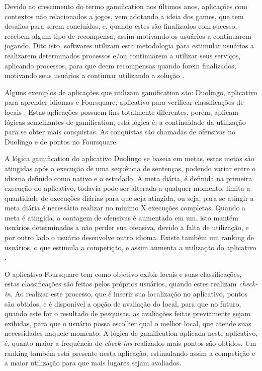 \par Devido ao crescimento do termo gamification nos últimos anos, \cite{groh2012gamification} aplicações com contextos não relacionados a jogos, vem adotando a ideia dos games, que tem desafios para serem concluídos, e, quando estes são finalizados com sucesso, recebem algum tipo de recompensa, assim motivando os usuários a continuarem jogando. Dito isto, softwares utilizam esta metodologia para estimular usuários a realizarem determinados processos e/ou continuarem a utilizar seus serviços, aplicando processos, para que deem recompensas quando forem finalizados, motivando seus usuários a continuar utilizando a solução \cite{hamari2014does}.
\par Alguns exemplos de aplicações que utilizam gamification são: Duolingo, aplicativo para aprender idiomas \cite{melo2016eficiencia} e Foursquare, aplicativo para verificar classificações de locais \cite{huotari2012defining}. Estas aplicações possuem fins totalmente diferentes, porém, aplicam lógicas semelhantes de gamification, está lógica é, a continuidade da utilização para se obter mais conquistas. As conquistas são chamadas de ofensivas no Duolingo e de pontos no Foursquare.
\par A lógica gamification do aplicativo Duolingo se baseia em metas, estas metas são atingidas após a execução de uma sequência de sentenças, podendo variar entre o idioma definido como nativo e o estudado. A meta diária, é definida na primeira execução do aplicativo, todavia pode ser alterada a qualquer momento, limita a quantidade de execuções diárias para que seja atingida, ou seja, para se atingir a meta diária é necessário realizar no mínimo X execuções completas. Quando a meta é atingida, a contagem de ofensivas é aumentada em um, isto mantém usuários determinados a não perder sua ofensiva, devido a falta de utilização, e por outro lado o usuário desenvolve outro idioma. Existe também um ranking de usuários, o que estimula a competição, e assim aumenta a utilização do aplicativo \cite{melo2016eficiencia}. 
\par O aplicativo Foursquare tem como objetivo exibir locais e suas classificações, estas classificações são feitas pelos próprios usuários, quando estes realizam \textit{check-in}. Ao realizar este processo, que é inserir sua localização no aplicativo, pontos são obtidos, e é disponível a opção de avaliação do local, para que no futuro, quando este for o resultado de pesquisas, as avaliações feitas previamente sejam exibidas, para que o usuário possa escolher qual o melhor local, que atende suas necessidades naquele momento. A lógica de gamification aplicada neste aplicativo, é, quanto maior a frequência de \textit{check-ins} realizados mais pontos são obtidos. Um ranking também está presente nesta aplicação, estimulando assim a competição e a maior utilização para que mais lugares sejam avaliados\cite{huotari2012defining}.
